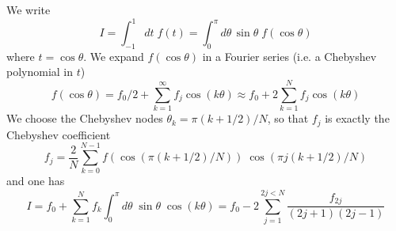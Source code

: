 \documentclass{article}
\begin{document}
We write
$$
I=\int_{-1}^1 dt\;f(t)=\int_0^\pi d\theta\,\sin\theta\;f(\cos\theta)
$$
where $t=\cos\theta$. We expand $f(\cos\theta)$ in a Fourier series (i.e. a Chebyshev polynomial in $t$)
$$
f(\cos\theta) =f_0/2 + \sum_{k=1}^\infty f_j \cos(k\theta)\approx f_0 + 2\sum_{k=1}^N f_j \cos(k\theta)
$$
We choose the Chebyshev nodes $\theta_k = \pi(k+1/2)/N$, so that $f_j$ is exactly the Chebyshev coefficient
$$
f_j = \frac{2}{N}\sum_{k=0}^{N-1} f(\cos(\pi(k+1/2)/N))\;\cos(\pi j (k+1/2)/N)
$$
and one has
$$
I = f_0 + \sum_{k=1}^N f_k\int_0^\pi d\theta \;\sin\theta\;\cos(k\theta) =
f_0- 2\sum_{j=1}^{2j<N} \frac{f_{2j}}{(2j+1)(2j-1)}
$$
\end{document}
